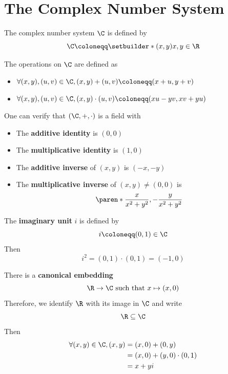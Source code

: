 \section{The Complex Number System}

\begin{definition} \label{an:def:complex-number-system}
  The complex number system $\C$ is defined by
  \[
    \C \coloneqq \setbuilder*{(x, y)}{x, y \in \R}
  \]
\end{definition}

\bigskip

\begin{definition} \label{an:def:operations-on-C}
  The operations on $\C$ are defined as
  \begin{itemize}
    \item $\forall (x, y), (u, v) \in \C, (x, y) + (u, v) \coloneqq (x + u, y + v)$
    \item $\forall (x, y), (u, v) \in \C, (x, y) \cdot (u, v) \coloneqq (xu - yv, xv + yu)$
  \end{itemize}
\end{definition}

\bigskip

\begin{remark}
  One can verify that $(\C, +, \cdot)$ is a field with
  \begin{itemize}
    \item The \textbf{additive identity} is $(0, 0)$
    \item The \textbf{multiplicative identity} is $(1, 0)$
    \item The \textbf{additive inverse} of $(x, y)$ is $(-x, -y)$
    \item The \textbf{multiplicative inverse} of $(x, y) \neq (0, 0)$ is
          \[
            \paren*{\frac{x}{x^{2} + y^{2}}, - \frac{y}{x^{2} + y^{2}}}
          \]
  \end{itemize}
\end{remark}

\bigskip

\begin{definition} \label{an:def:imaginary-unit}
  The \textbf{imaginary unit} $i$ is defined by
  \[
    i \coloneqq (0, 1) \in \C
  \]
  Then
  \[
    i^{2} = (0, 1) \cdot (0, 1) = (-1, 0)
  \]
\end{definition}

\bigskip

\begin{remark}
  There is a \textbf{canonical embedding}
  \[
    \R \to \C \text{ such that } x \mapsto (x, 0)
  \]
  Therefore, we identify $\R$ with its image in $\C$ and write
  \[
    \R \subseteq \C
  \]
  Then
  \begin{align*}
    \forall (x, y) \in \C, (x, y) & = (x, 0) + (0, y)              \\
                                  & = (x, 0) + (y, 0) \cdot (0, 1) \\
                                  & = x + yi
  \end{align*}
\end{remark}

